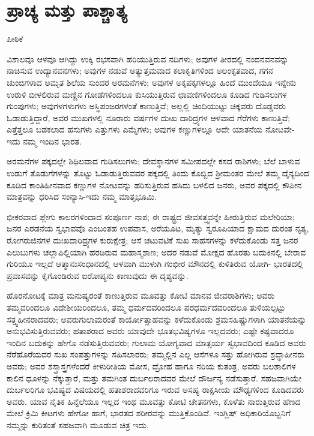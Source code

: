 
\chapter{ಪ್ರಾಚ್ಯ ಮತ್ತು ಪಾಶ್ಚಾತ್ಯ}

\begin{center}
ಪೀಠಿಕೆ
\end{center}

ವಿಶಾಲವೂ ಆಳವೂ ಆಗಿದ್ದು ಉಕ್ಕಿ ರಭಸವಾಗಿ ಹರಿಯುತ್ತಿರುವ ನದಿಗಳು; ಅವುಗಳ ತೀರದಲ್ಲಿ ನಂದನವನವನ್ನು ನಾಚಿಸುವ ಉದ್ಯಾನವನಗಳು; ಅವುಗಳ ನಡುವೆ ಅತ್ಯುತ್ತಮವಾದ ಕಲಾಕೃತಿಗಳಿಂದ ಅಲಂಕೃತವಾದ, ಗಗನ ಚುಂಬಿಗಳಾದ ಅಮೃತ ಶಿಲೆಯ ಸುಂದರ ಅರಮನೆಗಳು; ಅವುಗಳ ಅಕ್ಕಪಕ್ಕಗಳಲ್ಲೂ ಹಿಂದೆ ಮುಂದೆಯೂ ಇನ್ನೇನು ಉರುಳಿ ಬೀಳಲಿರುವ ಮಣ್ಣಿನ ಗೋಡೆಗಳಿಂದಲೂ ಕುಸಿಯುತ್ತಿರುವ ಛಾವಣಿಗಳಿಂದಲೂ ಕೂಡಿದ ಗುಡಿಸಲುಗಳ ಗುಂಪುಗಳು; ಅವುಗಳಗಳುಗಳು ಅಸ್ಥಿಪಂಜರಗಳಂತೆ ಕಾಣುತ್ತಿವೆ; ಅಲ್ಲಲ್ಲಿ ಚಿಂದಿಯುಟ್ಟು ಚಿಕ್ಕವರು ದೊಡ್ಡವರು ಓಡಾಡುತ್ತಿದ್ದಾರೆ, ಅವರ ಮುಖಗಳಲ್ಲಿ ನೂರಾರು ವರ್ಷಗಳ ದುಃಖ ದಾರಿದ್ರ್ಯಗಳ ಆಳವಾದ ಗೆರೆಗಳು ಕಾಣುತ್ತಿವೆ; ಎತ್ತೆತ್ತಲೂ ಬಡಕಲಾದ ಹಸುಗಳು ಎತ್ತುಗಳು ಎಮ್ಮೆಗಳು; ಅವುಗಳ ಕಣ್ಣುಗಳಲ್ಲೂ ಅದೇ ಯಾತನೆಯ ನೋಟವೇ- ಇದು ನಮ್ಮ ಇಂದಿನ ಭಾರತ.

ಅರಮನೆಗಳ ಪಕ್ಕದಲ್ಲೇ ಶಿಥಿಲವಾದ ಗುಡಿಸಲುಗಳು; ದೇವಸ್ಥಾನಗಳ ಸಮೀಪದಲ್ಲೇ ಕಸದ ರಾಶಿಗಳು; ಬೆಲೆ ಬಾಳುವ ಉಡುಗೆ ತೊಡುಗೆಗಳನ್ನು ತೊಟ್ಟು ಓಡಾಡುತ್ತಿರುವವರ ಪಕ್ಕದಲ್ಲಿ ತಿಂದು ಕೊಬ್ಬಿದ ಶ‍್ರೀಮಂತರ ಮೇಲೆ ತಮ್ಮ ದೈನ್ಯದಿಂದ ಕೂಡಿದ ಕಾಂತಿಹೀನವಾದ ಕಣ್ಣುಗಳ ನೋಟವನ್ನು ಹರಿಸುತ್ತಿರುವ ಹಸಿದು ಬಳಲಿದ ಜನರು, ಅವರ ಪಕ್ಕದಲ್ಲಿ ಕೌಪೀನ ಮಾತ್ರವನ್ನು ಧರಿಸಿದ ಸಂನ್ಯಾಸಿ-ಇದು ನಮ್ಮ ಮಾತೃಭೂಮಿ.

ಭೀಕರವಾದ ಪ್ಲೇಗು ಕಾಲರಗಳಿಂದಾದ ಸಂಪೂರ್ಣ ನಾಶ; ಈ ರಾಷ್ಟ್ರದ ಜೀವಸತ್ತ್ವ\break ವನ್ನೇ ಹೀರುತ್ತಿರುವ ಮಲೇರಿಯಾ; ಜನರ ಎರಡನೆಯ ಸ್ವಭಾವವೊ ಎಂಬಂತಹ ಉಪವಾಸ, ಅರೆಯೂಟ, ಮೃತ್ಯು ಸ್ವರೂಪಿಯಾದ ಕ್ಷಾಮದ ದುರಂತ ನೃತ್ಯ, ರೋಗರುಜಿನಗಳ ದುಃಖದಾರಿದ್ರ್ಯಗಳ ಕುರುಕ್ಷೇತ್ರ; ಆಸೆ ಚಟುವಟಿಕೆ ಸುಖ ಸಾಹಸಗಳನ್ನು ಕಳೆದುಕೊಂಡು ಸತ್ತ ಜನರ ಎಲುಬುಗಳು ಚಲ್ಲಾಪಿಲ್ಲಿಯಾಗಿ ಹರಡಿರುವ ಮಹಾಸ್ಮಶಾಣ; ಅದರ ನಡುವೆ ಮೋಕ್ಷದ ಹೊರತು ಬದುಕಿನಲ್ಲಿ ಬೇರಾವ ಗುರಿಯೂ ಇಲ್ಲದೆ ಆತ್ಮಾನುಸಂಧಾನದಲ್ಲಿ ಆಳವಾಗಿ ಮುಳುಗಿ ಗಂಭೀರ ಮೌನದಲ್ಲಿ ಕುಳಿತಿರುವ ಯೋಗಿ- ಭಾರತದಲ್ಲಿ ಪ್ರವಾಸವನ್ನು ಕೈಗೊಂಡಿರುವ ಐರೋಪ್ಯನು ಕಾಣುವುದು ಈ ದೃಶ್ಯವನ್ನು.

ಹೊರನೋಟಕ್ಕೆ ಮಾತ್ರ ಮನುಷ್ಯರಂತೆ ಕಾಣುತ್ತಿರುವ ಮೂವತ್ತು ಕೋಟಿ ಮಾನವ ಜೀವರಾಶಿಗಳು; ಅವರು ತಮ್ಮವರಿಂದಲೂ ವಿದೇಶೀಯರಿಂದಲೂ, ತಮ್ಮ ಧರ್ಮದವರಿಂದಲೂ ಪರಧರ್ಮದವರಿಂದಲೂ ತುಳಿಯಲ್ಪಟ್ಟು ಸತ್ತ್ವಹೀನರಾದವರು; ಅವರು\break ಗುಲಾಮರಂತೆ ಕಾರ್ಯೋತ್ಸಾಹವನ್ನು ಕಳೆದುಕೊಂಡು ಶ್ರಮಸಹಿಷ್ಣುಗಳಾಗಿ ಯಾತನೆಯನ್ನು ಅನುಭವಿಸುತ್ತಿರುವವರು; ಹತಾಶರಾದ ಅವರು ಯಾವುದೇ ಭೂತಭವಿಷ್ಯಗಳೂ ಇಲ್ಲದವರು; ಎಷ್ಟೇ ಕಷ್ಟವಾದರೂ ಇಂದಿನ ಬದುಕನ್ನು ಹೇಗೊ ನಡೆಸುತ್ತಿರುವವರು; ಗುಲಾಮ ಯೋಗ್ಯವಾದ ಮಾತ್ಸರ್ಯ ಸ್ವಭಾವದಿಂದ ಕೂಡಿದ ಅವರು ನೆರೆಹೊರೆಯವರ ಸುಖ ಸಂಪತ್ತುಗಳನ್ನು ಸಹಿಸಲಾರರು; ತಮ್ಮಲ್ಲಿನ ಎಲ್ಲ ಆಸೆಗಳೂ ಸತ್ತು ಹೋಗಿರುವ ಶ್ರದ್ಧಾಹೀನರು ಅವರು; ಅವರ ಶಸ್ತ್ರಾಸ್ತ್ರಗಳೆಂದರೆ ಕೀಳುರೀತಿಯ ಮೋಸ, ದ್ರೋಹ ಹಾಗೂ ನರಿಯ ಕುತಂತ್ರ, ಅವರು ಬಲಶಾಲಿಗಳ ಕಾಲಿನ ಧೂಳನ್ನು ನೆಕ್ಕುತ್ತಾರೆ, ಮತ್ತು ತಮಗಿಂತ ದುರ್ಬಲರಾದವರ ಮೇಲೆ ದೌರ್ಜನ್ಯ ನಡೆಸುತ್ತಾರೆ. ಸಹಜವಾಗಿಯೇ ದುರ್ಬಲರಿಗೂ ಭವಿಷ್ಯದ ವಿಷಯದಲ್ಲಿ ಹತಾಶರಾದವರಿಗೂ ಇರುವ ಅಸಹ್ಯ ರಾಕ್ಷಸೀಯ ಮೌಢ್ಯಗಳಿಂದ ಕೂಡಿದವರು ಅವರು. ಯಾವ ನೈತಿಕ ಹಿನ್ನೆಲೆಯೂ ಇಲ್ಲದ ಇಂಥ ಮೂವತ್ತು ಕೋಟಿ ಚೇತನಗಳು, ಕೊಳೆತು ನಾರುತ್ತಿರುವ ಹೆಣದ ಮೇಲೆ ಕ್ರಿಮಿ ಕೀಟಗಳು ಹೇಗೋ ಹಾಗೆ, ಭಾರತದ ಶರೀರವನ್ನು ಮುತ್ತಿಕೊಂಡಿವೆ. ಇಂಗ್ಲಿಷ್​ ಅಧಿಕಾರಿಯೊಬ್ಬನಿಗೆ ನಮ್ಮನ್ನು ಕುರಿತಂತೆ ಸಹಜವಾಗಿ ಮೂಡುವ ಚಿತ್ರ ಇದು.

